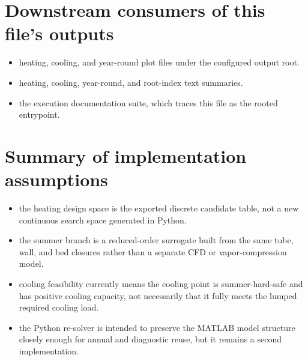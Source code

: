 \documentclass[11pt]{article}
\begin{document}
\section{Downstream consumers of this file's outputs}
\begin{itemize}[leftmargin=*]
\item heating, cooling, and year-round plot files under the configured output root.
\item heating, cooling, year-round, and root-index text summaries.
\item the execution documentation suite, which traces this file as the rooted entrypoint.
\end{itemize}

\section{Summary of implementation assumptions}
\begin{itemize}[leftmargin=*]
\item the heating design space is the exported discrete candidate table, not a new continuous search space generated in Python.
\item the summer branch is a reduced-order surrogate built from the same tube, wall, and bed closures rather than a separate CFD or vapor-compression model.
\item cooling feasibility currently means the cooling point is summer-hard-safe and has positive cooling capacity, not necessarily that it fully meets the lumped required cooling load.
\item the Python re-solver is intended to preserve the MATLAB model structure closely enough for annual and diagnostic reuse, but it remains a second implementation.
\end{itemize}
\end{document}
